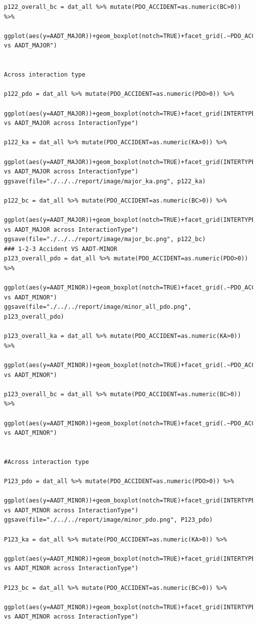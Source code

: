 \documentclass[11pt]{scrartcl} %
\begin{document}
\begin{lstlisting}
p122_overall_bc = dat_all %>% mutate(PDO_ACCIDENT=as.numeric(BC>0)) %>%
  ggplot(aes(y=AADT_MAJOR))+geom_boxplot(notch=TRUE)+facet_grid(.~PDO_ACCIDENT)+ggtitle("BC vs AADT_MAJOR")


Across interaction type

p122_pdo = dat_all %>% mutate(PDO_ACCIDENT=as.numeric(PDO>0)) %>%
  ggplot(aes(y=AADT_MAJOR))+geom_boxplot(notch=TRUE)+facet_grid(INTERTYPE~PDO_ACCIDENT)+ggtitle("PDO vs AADT_MAJOR across InteractionType")

p122_ka = dat_all %>% mutate(PDO_ACCIDENT=as.numeric(KA>0)) %>%
  ggplot(aes(y=AADT_MAJOR))+geom_boxplot(notch=TRUE)+facet_grid(INTERTYPE~PDO_ACCIDENT)+ggtitle("KA vs AADT_MAJOR across InteractionType")
ggsave(file="./../../report/image/major_ka.png", p122_ka)

p122_bc = dat_all %>% mutate(PDO_ACCIDENT=as.numeric(BC>0)) %>%
  ggplot(aes(y=AADT_MAJOR))+geom_boxplot(notch=TRUE)+facet_grid(INTERTYPE~PDO_ACCIDENT)+ggtitle("BC vs AADT_MAJOR across InteractionType")
ggsave(file="./../../report/image/major_bc.png", p122_bc)
### 1-2-3 Accident VS AADT-MINOR
p123_overall_pdo = dat_all %>% mutate(PDO_ACCIDENT=as.numeric(PDO>0)) %>%
  ggplot(aes(y=AADT_MINOR))+geom_boxplot(notch=TRUE)+facet_grid(.~PDO_ACCIDENT)+ggtitle("PDO vs AADT_MINOR")
ggsave(file="./../../report/image/minor_all_pdo.png", p123_overall_pdo)

p123_overall_ka = dat_all %>% mutate(PDO_ACCIDENT=as.numeric(KA>0)) %>%
  ggplot(aes(y=AADT_MINOR))+geom_boxplot(notch=TRUE)+facet_grid(.~PDO_ACCIDENT)+ggtitle("KA vs AADT_MINOR")

p123_overall_bc = dat_all %>% mutate(PDO_ACCIDENT=as.numeric(BC>0)) %>%
  ggplot(aes(y=AADT_MINOR))+geom_boxplot(notch=TRUE)+facet_grid(.~PDO_ACCIDENT)+ggtitle("BC vs AADT_MINOR")


#Across interaction type

P123_pdo = dat_all %>% mutate(PDO_ACCIDENT=as.numeric(PDO>0)) %>%
  ggplot(aes(y=AADT_MINOR))+geom_boxplot(notch=TRUE)+facet_grid(INTERTYPE~PDO_ACCIDENT)+ggtitle("PDO vs AADT_MINOR across InteractionType")
ggsave(file="./../../report/image/minor_pdo.png", P123_pdo)

P123_ka = dat_all %>% mutate(PDO_ACCIDENT=as.numeric(KA>0)) %>%
  ggplot(aes(y=AADT_MINOR))+geom_boxplot(notch=TRUE)+facet_grid(INTERTYPE~PDO_ACCIDENT)+ggtitle("KA vs AADT_MINOR across InteractionType")

P123_bc = dat_all %>% mutate(PDO_ACCIDENT=as.numeric(BC>0)) %>%
  ggplot(aes(y=AADT_MINOR))+geom_boxplot(notch=TRUE)+facet_grid(INTERTYPE~PDO_ACCIDENT)+ggtitle("BC vs AADT_MINOR across InteractionType")


\end{lstlisting}
\end{document}
